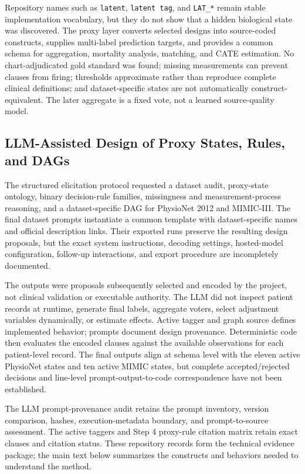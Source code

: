 Repository names such as \texttt{latent}, \texttt{latent tag}, and \texttt{LAT\_*} remain stable implementation vocabulary, but they do not show that a hidden biological state was discovered.  The proxy layer converts selected designs into source-coded constructs, supplies multi-label prediction targets, and provides a common schema for aggregation, mortality analysis, matching, and CATE estimation.  No chart-adjudicated gold standard was found; missing measurements can prevent clauses from firing; thresholds approximate rather than reproduce complete clinical definitions; and dataset-specific states are not automatically construct-equivalent.  The later aggregate is a fixed vote, not a learned source-quality model.

\subsection{LLM-Assisted Design of Proxy States, Rules, and DAGs}
\label{subsec:clinical-proxy-state-construction:llm-assisted-elicitation}

The structured elicitation protocol requested a dataset audit, proxy-state ontology, binary decision-rule families, missingness and measurement-process reasoning, and a dataset-specific DAG for PhysioNet 2012 and MIMIC-III.  The final dataset prompts instantiate a common template with dataset-specific names and official description links.  Their exported runs preserve the resulting design proposals, but the exact system instructions, decoding settings, hosted-model configuration, follow-up interactions, and export procedure are incompletely documented.

The outputs were proposals subsequently selected and encoded by the project, not clinical validation or executable authority.  The LLM did not inspect patient records at runtime, generate final labels, aggregate voters, select adjustment variables dynamically, or estimate effects.  Active tagger and graph source defines implemented behavior; prompts document design provenance.  Deterministic code then evaluates the encoded clauses against the available observations for each patient-level record.  The final outputs align at schema level with the eleven active PhysioNet states and ten active MIMIC states, but complete accepted/rejected decisions and line-level prompt-output-to-code correspondence have not been established.

The LLM prompt-provenance audit retains the prompt inventory, version comparison, hashes, execution-metadata boundary, and prompt-to-source assessment.  The active taggers and Step 4 proxy-rule citation matrix retain exact clauses and citation status.  These repository records form the technical evidence package; the main text below summarizes the constructs and behaviors needed to understand the method.

